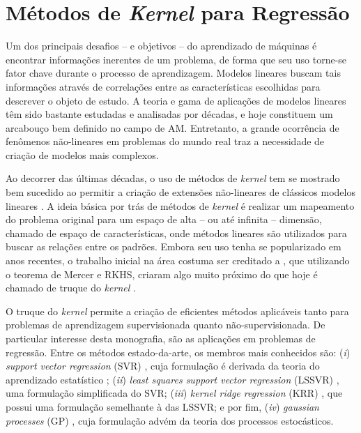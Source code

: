 \chapter{Métodos de \textit{Kernel} para Regressão} \label{chapter:kernel-methods}

Um dos principais desafios -- e objetivos -- do aprendizado de máquinas é encontrar informações inerentes de um problema, de forma que seu uso torne-se fator chave durante o processo de aprendizagem. Modelos lineares buscam tais informações através de correlações entre as características escolhidas para descrever o objeto de estudo. A teoria e gama de aplicações de modelos lineares têm sido bastante estudadas e analisadas por décadas, e hoje constituem um arcabouço bem definido no campo de AM. Entretanto, a grande ocorrência de fenômenos não-lineares em problemas do mundo real traz a necessidade de criação de modelos mais complexos.

Ao decorrer das últimas décadas, o uso de métodos de \textit{kernel} tem se mostrado bem sucedido ao permitir a criação de extensões não-lineares de clássicos modelos lineares \cite{abrahamsen2013}. A ideia básica por trás de métodos de \textit{kernel} é realizar um mapeamento do problema original para um espaço de alta -- ou até infinita -- dimensão, chamado de espaço de características, onde métodos lineares são utilizados para buscar as relações entre os padrões. Embora seu uso tenha se popularizado em anos recentes, o trabalho inicial na área costuma ser creditado a , que utilizando o teorema de Mercer e RKHS, criaram algo muito próximo do que hoje é chamado de truque do \textit{kernel} \cite{schlkopf2004}.

O truque do \textit{kernel} permite a criação de eficientes métodos aplicáveis tanto para problemas de aprendizagem supervisionada quanto não-supervisionada. De particular interesse desta monografia, são as aplicações em problemas de regressão. Entre os métodos estado-da-arte, os membros mais conhecidos são: (\textit{i}) \textit{support vector regression} (SVR) \cite{smola1997}, cuja formulação é derivada da teoria do aprendizado estatístico \cite{vapnik1995,vapnik1998}; (\textit{ii}) \textit{least squares support vector regression} (LSSVR) \cite{suykens2002}, uma formulação simplificada do SVR; (\textit{iii}) \textit{kernel ridge regression} (KRR) \cite{saunders1998}, que possui uma formulação semelhante à das LSSVR; e por fim, (\textit{iv}) \textit{gaussian processes} (GP) \cite{rasmussen2006}, cuja formulação advém da teoria dos processos estocásticos.

